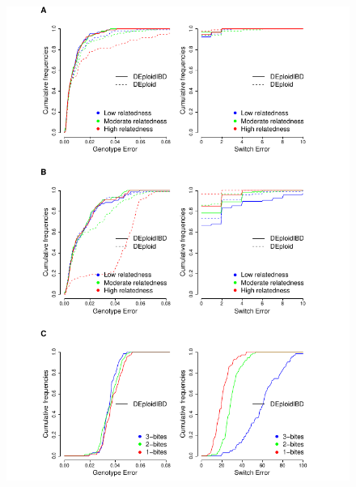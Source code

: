 \documentclass[9pt,lineno]{elife}
\begin{document}
\begin{figure}[ht]
  \begin{center}
  \includegraphics[width=\textwidth]{Fig3.pdf}
   \caption{}\label{fig:strainIBD}
   \end{center}
\end{figure}
\end{document}
